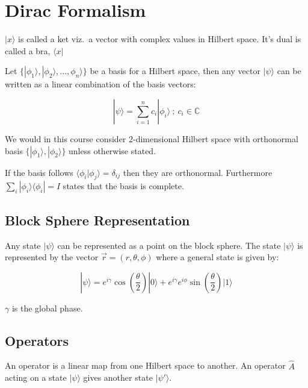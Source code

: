 \documentclass[
  letterpaper,
  DIV=11,
  numbers=noendperiod]{scrreprt}
\begin{document}

\section*{Dirac Formalism}\label{dirac-formalism}


\(|x\rangle\) is called a ket viz.~a vector with complex values in
Hilbert space. It's dual is called a bra, \(\langle x|\)

Let \(\{|\phi_1\rangle, |\phi_2\rangle, ..., \phi_n\rangle\}\) be a
basis for a Hilbert space, then any vector \(|\psi\rangle\) can be
written as a linear combination of the basis vectors:

\[ |\psi\rangle = \sum_{i=1}^n c_i |\phi_i\rangle\ ;\ c_i \in \mathbb{C} \]

We would in this course consider 2-dimensional Hilbert space with
orthonormal basis \(\{|\phi_1\rangle, |\phi_2\rangle\}\) unless
otherwise stated.

If the basis follows \(\langle \phi_i | \phi_j \rangle = \delta_{ij}\)
then they are orthonormal. Furthermore
\(\sum_{i} |\phi_i\rangle \langle \phi_i | = I\) states that the basis
is complete.

\subsection*{Block Sphere
Representation}\label{block-sphere-representation}

Any state \(|\psi\rangle\) can be represented as a point on the block
sphere. The state \(|\psi\rangle\) is represented by the vector
\(\vec{r} = (r, \theta, \phi)\) where a general state is given by:

\[ |\psi\rangle = e^{i\gamma} \cos(\frac{\theta}{2}) |0\rangle + e^{i\gamma}e^{i\phi} \sin(\frac{\theta}{2}) |1\rangle \]

\(\gamma\) is the global phase.

\subsection*{Operators}\label{operators}

An operator is a linear map from one Hilbert space to another. An
operator \(\hat{A}\) acting on a state \(|\psi\rangle\) gives another
state \(|\psi'\rangle\).
\end{document}
